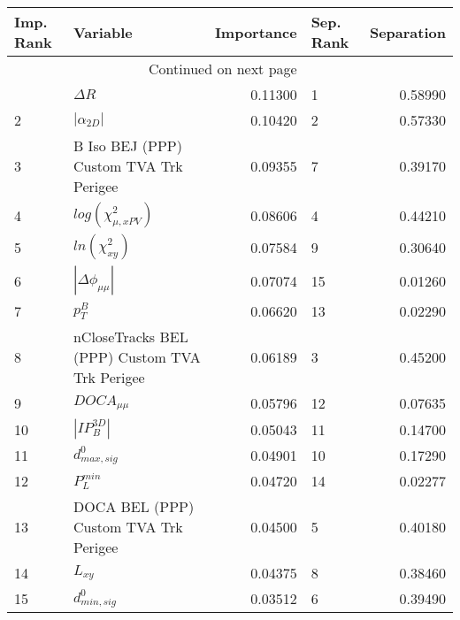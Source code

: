 \usepackage{lscape}

\begin{landscape}
\begin{longtable}{llrlr}
\toprule
Imp. Rank &                                       Variable &  Importance & Sep. Rank &  Separation \\
\midrule
\endhead
\midrule
\multicolumn{3}{r}{{Continued on next page}} \\
\midrule
\endfoot

\bottomrule
\endlastfoot
        1 &                                     $\Delta R$ &     0.11300 &         1 &     0.58990 \\
        2 &                                $|\alpha_{2D}|$ &     0.10420 &         2 &     0.57330 \\
        3 &         B Iso BEJ (PPP) Custom TVA Trk Perigee &     0.09355 &         7 &     0.39170 \\
        4 &                      $log(\chi^{2}_{\mu,xPV})$ &     0.08606 &         4 &     0.44210 \\
        5 &                            $ln(\chi^{2}_{xy})$ &     0.07584 &         9 &     0.30640 \\
        6 &                       $|\Delta \phi_{\mu\mu}|$ &     0.07074 &        15 &     0.01260 \\
        7 &                                      $p^B_{T}$ &     0.06620 &        13 &     0.02290 \\
        8 &  nCloseTracks BEL (PPP) Custom TVA Trk Perigee &     0.06189 &         3 &     0.45200 \\
        9 &                                $DOCA_{\mu\mu}$ &     0.05796 &        12 &     0.07635 \\
       10 &                                $|IP_{B}^{3D}|$ &     0.05043 &        11 &     0.14700 \\
       11 &                               $d^0_{max, sig}$ &     0.04901 &        10 &     0.17290 \\
       12 &                                  $P^{min}_{L}$ &     0.04720 &        14 &     0.02277 \\
       13 &          DOCA BEL (PPP) Custom TVA Trk Perigee &     0.04500 &         5 &     0.40180 \\
       14 &                                       $L_{xy}$ &     0.04375 &         8 &     0.38460 \\
       15 &                               $d^0_{min, sig}$ &     0.03512 &         6 &     0.39490 \\
\end{longtable}

\end{landscape}
